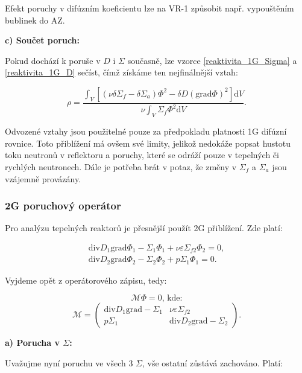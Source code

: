 Efekt poruchy v difúzním koeficientu lze na VR-1 způsobit např. vypouštěním bublinek do AZ.

\textbf{c) Součet poruch:}

Pokud dochází k poruše v $D$ i $\Sigma$ současně, lze vzorce \eqref{reaktivita_1G_Sigma} a \eqref{reaktivita_1G_D} sečíst, čímž získáme ten nejfinálnější vztah:

\begin{equation}
  \boxed{
  \rho = \dfrac{\int_V [(\nu \delta \Sigma_f - \delta \Sigma_a) \Phi^2 - \delta D (\text{grad}\Phi)^2] \text{d}V}{\nu \int_V \Sigma_f \Phi^2 \text{d}V}.
  \label{reaktivita_1G}}
\end{equation}

Odvozené vztahy jsou použitelné pouze za předpokladu platnosti 1G difúzní rovnice. Toto přiblížení má ovšem své limity, jelikož nedokáže popsat hustotu toku neutronů v reflektoru a poruchy, které se odráží pouze v tepelných či rychlých neutronech. Dále je potřeba brát v potaz, že změny v $\Sigma_f$ a $\Sigma_a$ jsou vzájemně provázány.

\subsubsection{2G poruchový operátor}

Pro analýzu tepelných reaktorů je přesnější použít 2G přiblížení. Zde platí:

\begin{equation}
  \begin{matrix}
  \text{div} D_1 \text{grad} \Phi_1 - \Sigma_1 \Phi_1 + \nu \varepsilon \Sigma_{f2} \Phi_2 = 0, \\
  \text{div} D_2 \text{grad} \Phi_2 - \Sigma_2 \Phi_2 + p \Sigma_1 \Phi_1 = 0.
  \end{matrix}
  \label{1G_difuzka}
\end{equation}

Vyjdeme opět z operátorového zápisu, tedy:

$$ \mathcal{M} \Phi = 0 \text{, kde:} $$
$$ \mathcal{M} = \begin{pmatrix} \text{div} D_1 \text{grad} -\Sigma_1 & \nu \varepsilon \Sigma_{f2} \\ p \Sigma_1 & \text{div} D_2 \text{grad} - \Sigma_2 \end{pmatrix}. $$

\textbf{a) Porucha v $\Sigma$:}

Uvažujme nyní poruchu ve všech 3 $\Sigma$, vše ostatní zůstává zachováno. Platí:

